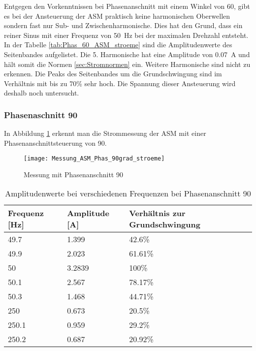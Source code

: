 \newpage
Entgegen den Vorkenntnissen bei Phasenanschnitt mit einem Winkel von 60\textdegree, gibt es bei der Ansteuerung der ASM praktisch keine harmonischen Oberwellen sondern fast nur Sub- und Zwischenharmonische. Dies hat den Grund, dass ein reiner Sinus mit einer Frequenz von \SI{50}{Hz} bei der maximalen Drehzahl entsteht. In der Tabelle \ref{tab:Phas_60_ASM_stroeme} sind die Amplitudenwerte des Seitenbandes aufgelistet. Die 5. Harmonische hat eine Amplitude von \SI{0.07}{A} und hält somit die Normen \ref{sec:Stromnormen} ein. Weitere Harmonische sind nicht zu erkennen. Die Peaks des Seitenbandes um die Grundschwingung sind im Verhältnis mit bis zu 70\% sehr hoch. Die Spannung dieser Ansteuerung wird deshalb noch untersucht.


\subsubsection*{Phasenaschnitt 90\textdegree}

In Abbildung \ref{fig:Mess_Phas_90grad_stroeme} erkennt man die Strommessung der ASM mit einer Phasenanschnittsteuerung von 90\textdegree \hspace{0.02cm}.

\begin{figure}[ht!]
	\centering
	\texttt{[image: Messung\_ASM\_Phas\_90grad\_stroeme]}	
	\caption{Messung mit Phasenanschnitt 90\textdegree}\label{fig:Mess_Phas_90grad_stroeme}
\end{figure}


\begin{table}[ht!]
	\centering
	\begin{tabular}{|l|l|l|}
		\hline
		Frequenz {[}Hz{]} & Amplitude {[}A{]} & Verhältnis zur Grundschwingung	\\ \hline
		49.7              & 1.399             & 42.6\%							\\ \hline
		49.9              & 2.023             & 61.61\%							\\ \hline
		50                & 3.2839            & 100\%							\\ \hline
		50.1              & 2.567             & 78.17\%							\\ \hline
		50.3              & 1.468             & 44.71\%							\\ \hline
		250               & 0.673             & 20.5\%							\\ \hline
		250.1             & 0.959             & 29.2\%							\\ \hline
		250.2             & 0.687             & 20.92\%							\\ \hline
	\end{tabular}
	\caption{Amplitudenwerte bei verschiedenen Frequenzen bei Phasenanschnitt 90\textdegree}\label{tab:Phas_90_ASM_stroeme}
\end{table}

